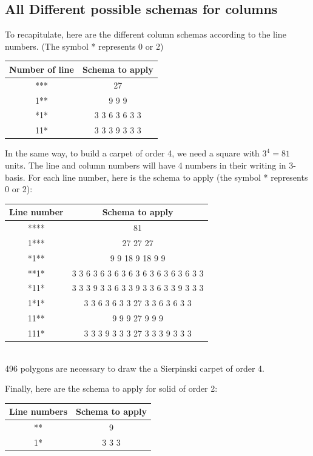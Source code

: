 \subsection{All Different possible schemas for columns}
To recapitulate, here are the different column schemas according to the line numbers. (The symbol * represents 0 or 2)
\begin{center}
 \begin{tabular}{|c|c|}
 \hline
Number of line & Schema to apply \\
\hline
*** & 27 \\ 
\hline
1** &  9 9 9 \\
\hline
*1* & 3 3 6 3 6 3 3\\
\hline
11* & 3 3 3 9 3 3 3\\
\hline
\end{tabular}
\end{center}
In the same way, to build a carpet of order 4, we need a square with $3^4=81$ units. The line and column numbers will have 4 numbers in their writing in 3-basis. For each line number, here is the schema to apply (the symbol * represents 0 or 2):
\begin{center}
 \begin{tabular}{|c|c|}
 \hline
Line number & Schema to apply \\
\hline
 **** & 81 \\ 
\hline
1*** &  27 27 27 \\
\hline
*1** & 9 9 18 9 18 9 9 \\
\hline
**1* & 3 3 6 3 6 3 6 3 6 3 6 3 6 3 6 3 6 3 3 \\
\hline
*11* &  3 3 3 9 3 3 6 3 3 9 3 3 6 3 3 9 3 3 3 \\
\hline
1*1* & 3 3 6 3 6 3 3 27 3 3 6 3 6 3 3 \\
\hline
11** & 9 9 9 27 9 9 9 \\
\hline
111*& 3 3 3 9 3 3 3 27 3 3 3 9 3 3 3 \\
\hline
\end{tabular}\\
496 polygons are necessary to draw the a Sierpinski carpet of order 4.\\
\end{center}
Finally, here are the schema to apply for solid of order 2:
\begin{center}
  \begin{tabular}{|c|c|}
 \hline
Line numbers & Schema to apply\\
\hline
** &  9 \\
\hline
1* & 3 3 3 \\ 
\hline
\end{tabular}
\end{center}
